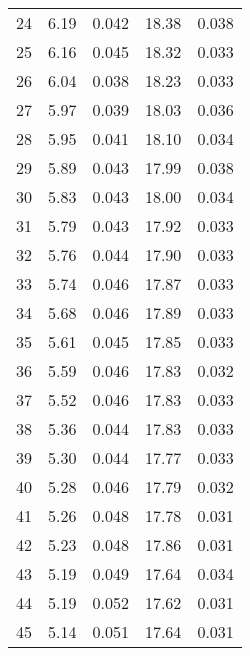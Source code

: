 \begin{table}
\begin{tabular}{c|ll|ll}
24 & 6.19 & 0.042 & 18.38 & 0.038 \\
25 & 6.16 & 0.045 & 18.32 & 0.033 \\
26 & 6.04 & 0.038 & 18.23 & 0.033 \\
27 & 5.97 & 0.039 & 18.03 & 0.036 \\
28 & 5.95 & 0.041 & 18.10 & 0.034 \\
29 & 5.89 & 0.043 & 17.99 & 0.038 \\
30 & 5.83 & 0.043 & 18.00 & 0.034 \\
31 & 5.79 & 0.043 & 17.92 & 0.033 \\
32 & 5.76 & 0.044 & 17.90 & 0.033 \\
33 & 5.74 & 0.046 & 17.87 & 0.033 \\
34 & 5.68 & 0.046 & 17.89 & 0.033 \\
35 & 5.61 & 0.045 & 17.85 & 0.033 \\
36 & 5.59 & 0.046 & 17.83 & 0.032 \\
37 & 5.52 & 0.046 & 17.83 & 0.033 \\
38 & 5.36 & 0.044 & 17.83 & 0.033 \\
39 & 5.30 & 0.044 & 17.77 & 0.033 \\
40 & 5.28 & 0.046 & 17.79 & 0.032 \\
41 & 5.26 & 0.048 & 17.78 & 0.031 \\
42 & 5.23 & 0.048 & 17.86 & 0.031 \\
43 & 5.19 & 0.049 & 17.64 & 0.034 \\
44 & 5.19 & 0.052 & 17.62 & 0.031 \\
45 & 5.14 & 0.051 & 17.64 & 0.031 \\
               \hline
        \end{tabular}
    \end{table}
    \clearpage

